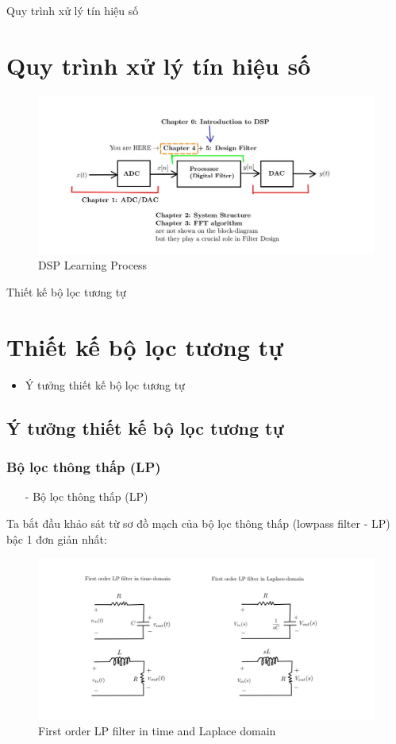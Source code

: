 \documentclass[8pt]{beamer}
\begin{document}
\begin{frame}{Quy trình xử lý tín hiệu số}
\section{Quy trình xử lý tín hiệu số}
\begin{figure}[h]
			\includegraphics[width=1.1\textwidth]{1.jpg}
			\caption{DSP Learning Process}			\label{fig:re1}
		\end{figure}

\end{frame}
\begin{frame}{Thiết kế bộ lọc tương tự}
\section{Thiết kế bộ lọc tương tự}
\begin{itemize}
	\item Ý tưởng thiết kế bộ lọc tương tự 
\end{itemize}
\subsection{Ý tưởng thiết kế bộ lọc tương tự}
\subsubsection{Bộ lọc thông thấp (LP)}
\begin{itemize}
\item[-] Bộ lọc thông thấp (LP)
\end{itemize}
Ta bắt đầu khảo sát từ sơ đồ mạch của bộ lọc thông thấp (lowpass filter - LP) bậc 1 đơn giản nhất:
\begin{figure}[h]
			\includegraphics[width=1\textwidth]{2.jpg}
			\caption{First order LP filter in time and Laplace domain}			\label{fig:re2}
		\end{figure}

\end{frame}
\end{document}
